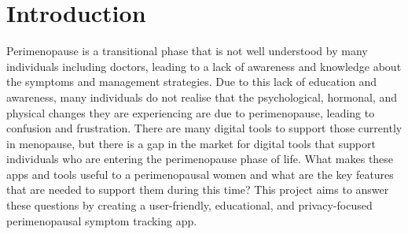 \section{Introduction}


Perimenopause is a transitional phase that is not well understood by many individuals including doctors, leading to a lack of awareness and knowledge about the symptoms and management strategies. Due to this lack of education and awareness, many individuals do not realise that the psychological, hormonal, and physical changes they are experiencing are due to perimenopause, leading to confusion and frustration\cite{Muir2022}. There are many digital tools to support those currently in menopause, but there is a gap in the market for digital tools that support individuals who are entering the perimenopause phase of life. What makes these apps and tools useful to a perimenopausal women and what are the key features that are needed to support them during this time? This project aims to answer these questions by creating a user-friendly, educational, and privacy-focused perimenopausal symptom tracking app.
